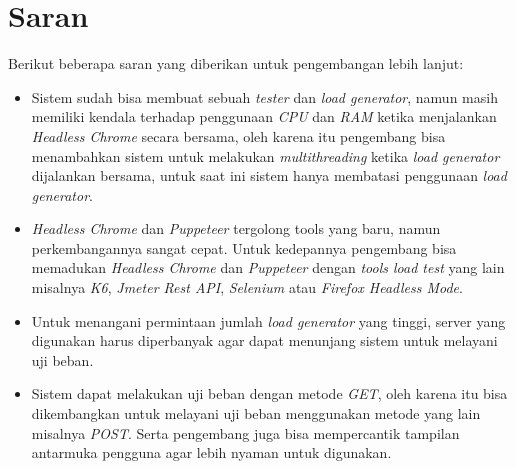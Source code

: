 	\section{Saran}
		Berikut beberapa saran yang diberikan untuk pengembangan lebih lanjut:
		\begin{itemize}
			\item Sistem sudah bisa membuat sebuah \textit{tester} dan \textit{load generator}, namun masih memiliki kendala terhadap penggunaan \textit{CPU} dan \textit{RAM} ketika menjalankan \textit{Headless Chrome} secara bersama, oleh karena itu pengembang bisa menambahkan sistem untuk melakukan \textit{multithreading} ketika \textit{load generator} dijalankan bersama, untuk saat ini sistem hanya membatasi penggunaan \textit{load generator}.
			\item \textit{Headless Chrome} dan \textit{Puppeteer} tergolong tools yang baru, namun perkembangannya sangat cepat. Untuk kedepannya pengembang bisa memadukan \textit{Headless Chrome} dan \textit{Puppeteer} dengan \textit{tools load test} yang lain misalnya \textit{K6}, \textit{Jmeter Rest API}, \textit{Selenium} atau \textit{Firefox Headless Mode}.
			\item Untuk menangani permintaan jumlah \textit{load generator} yang tinggi, server yang digunakan harus diperbanyak agar dapat menunjang sistem untuk melayani uji beban.
			\item Sistem dapat melakukan uji beban dengan metode \textit{GET}, oleh karena itu bisa dikembangkan untuk melayani uji beban menggunakan metode yang lain misalnya \textit{POST}. Serta pengembang juga bisa mempercantik tampilan antarmuka pengguna agar lebih nyaman untuk digunakan.
		\end{itemize}